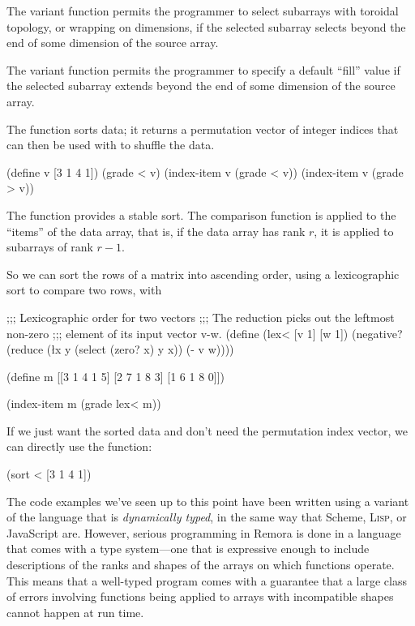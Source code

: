 The variant function  permits the programmer to select
subarrays with toroidal topology, or wrapping on dimensions, if the selected
subarray selects beyond the end of some dimension of the source array.

The variant function  permits the programmer to
specify a default ``fill'' value if the selected subarray extends
beyond the end of some dimension of the source array.


The  function sorts data;
it returns a permutation vector of integer indices
that can then be used with  to shuffle the data.

\begin{code}
    (define v [3 1 4 1])
    (grade < v)
\result{[1 3 0 2]}\pagebreak[0]
    (index-item v (grade < v))
\result{[1 1 3 4]}
    (index-item v (grade > v))
\result{[4 3 1 1]}\end{code}

The  function provides a stable sort. 
The comparison function is applied to the ``items'' of the data array,
that is, if the data array has rank $r$, it is applied to subarrays
of rank $r-1$.

So we can sort the rows of a matrix into ascending order,
using a lexicographic sort to compare two rows, with
\begin{code}
    ;;; Lexicographic order for two vectors
    ;;; The reduction picks out the leftmost non-zero
    ;;; element of its input vector v-w.
    (define (lex< [v 1] [w 1])
      (negative? (reduce (\l{x y} (select (zero? x) y x))
                         (- v w))))

    (define m [[3 1 4 1 5]
               [2 7 1 8 3]
               [1 6 1 8 0]])

    (index-item m (grade lex< m))
\result{[[1 6 1 8 0]
 [2 7 1 8 3]
 [3 1 4 1 5]]}\end{code}

If we just want the sorted data and don't need the permutation index vector, 
we can directly use the  function:
\begin{code}
    (sort < [3 1 4 1])
\result{[1 1 3 4]}\end{code}

\newpage

The code examples we've seen up to this point have been written
using a variant of the language that is \emph{dynamically typed},
in the same way that Scheme, \textsc{Lisp}, or JavaScript are.
However, serious programming in Remora is done in a language that comes with
a type system---one that is expressive enough to include descriptions of
the ranks and shapes of the arrays on which functions operate.
This means that a well-typed program comes with a guarantee that a large
class of errors involving functions being applied to arrays with incompatible
shapes cannot happen at run time.


